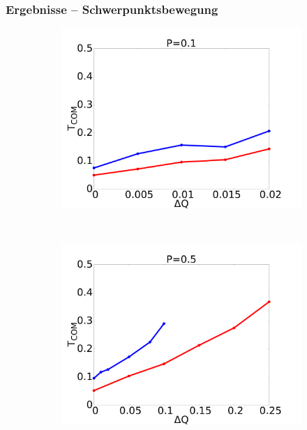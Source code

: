 \documentclass{beamer}
\begin{document}
\begin{frame}
\frametitle{Ergebnisse -- Schwerpunktsbewegung}
\begin{figure}
    \begin{center}
        \begin{subfigure}[t]{0.3\textwidth}
            \includegraphics[scale=0.11]{../images/p01_com.pdf}
        \end{subfigure} 
        \
        \begin{subfigure}[t]{0.3\textwidth}
            \includegraphics[scale=0.11]{../images/p05_com.pdf}
        \end{subfigure} 
        \
        \begin{subfigure}[t]{0.3\textwidth}

\end{subfigure}
\end{center}
\end{figure}
\end{frame}
\end{document}
